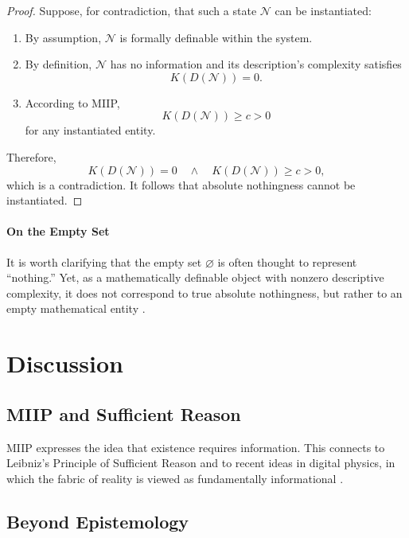\documentclass[12pt,a4paper]{article}
\begin{document}
\begin{proof}
Suppose, for contradiction, that such a state $\mathcal{N}$ can be instantiated:

\begin{enumerate}[label=(\alph*)]
  \item By assumption, $\mathcal{N}$ is formally definable within the system.
  \item By definition, $\mathcal{N}$ has no information and its description’s complexity satisfies
  \[
  K(D(\mathcal{N})) = 0.
  \]
  \item According to MIIP,
  \[
  K(D(\mathcal{N})) \geq c > 0
  \]
  for any instantiated entity.
\end{enumerate}

Therefore,
\[
K(D(\mathcal{N})) = 0 \quad \wedge \quad K(D(\mathcal{N})) \geq c > 0,
\]
which is a contradiction. It follows that absolute nothingness cannot be instantiated.
\end{proof}

\paragraph{On the Empty Set}

It is worth clarifying that the empty set $\varnothing$ is often thought to represent ``nothing.'' Yet, as a mathematically definable object with nonzero descriptive complexity, it does not correspond to true absolute nothingness, but rather to an empty mathematical entity \cite{Jech2003}.

\section{Discussion}

\subsection{MIIP and Sufficient Reason}

MIIP expresses the idea that existence requires information. This connects to Leibniz’s Principle of Sufficient Reason \cite{Leibniz1714} and to recent ideas in digital physics, in which the fabric of reality is viewed as fundamentally informational \cite{Tegmark2008}.

\subsection{Beyond Epistemology}
\end{document}
